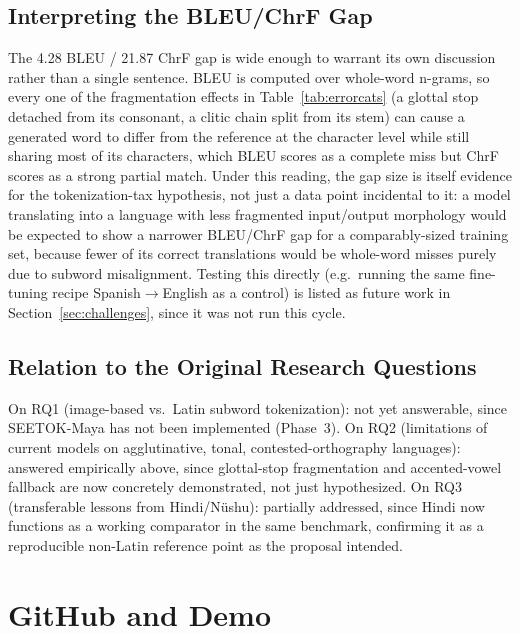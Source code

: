 \documentclass[11pt]{article}
\begin{document}
\subsection{Interpreting the BLEU/ChrF Gap}
\label{sec:bleuchrf}

The 4.28 BLEU / 21.87 ChrF gap is wide enough to warrant its own discussion
rather than a single sentence. BLEU is computed over whole-word n-grams, so
every one of the fragmentation effects in
Table~\ref{tab:errorcats} (a glottal stop detached from its consonant, a
clitic chain split from its stem) can cause a generated word to differ from
the reference at the character level while still sharing most of its
characters, which BLEU scores as a complete miss but ChrF scores as a strong
partial match. Under this reading, the gap size is itself evidence for the
tokenization-tax hypothesis, not just a data point incidental to it: a
model translating into a language with less fragmented input/output
morphology would be expected to show a narrower BLEU/ChrF gap for a
comparably-sized training set, because fewer of its correct translations
would be whole-word misses purely due to subword misalignment. Testing this
directly (e.g.\ running the same fine-tuning recipe Spanish$\to$English as a
control) is listed as future work in Section~\ref{sec:challenges}, since it
was not run this cycle.

\subsection{Relation to the Original Research Questions}

On RQ1 (image-based vs.\ Latin subword tokenization): not yet answerable,
since SEETOK-Maya has not been implemented (Phase~3). On RQ2 (limitations of
current models on agglutinative, tonal, contested-orthography languages):
answered empirically above, since glottal-stop fragmentation and accented-vowel
fallback are now concretely demonstrated, not just hypothesized. On RQ3
(transferable lessons from Hindi/N\"ushu): partially addressed, since Hindi now
functions as a working comparator in the same benchmark, confirming it as a
reproducible non-Latin reference point as the proposal intended.

\section{GitHub and Demo}
\label{sec:github}
\end{document}
